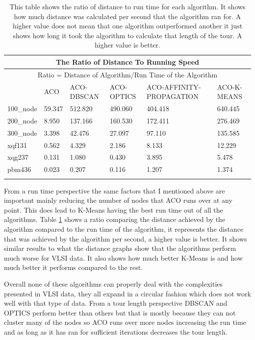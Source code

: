 \begin{longtable}[c]{|p{2cm}|p{1cm}|p{2cm}|p{2cm}|p{3cm}|p{2cm}|}
\hline
\multicolumn{6}{|c|}{The Ratio of Distance To Running Speed}                          \\ \hline
\endhead
%
\multicolumn{6}{|c|}{Ratio = Distance of Algorithm/Run Time of the Algorithm}         \\ \hline
          & ACO    & ACO-DBSCAN & ACO-OPTICS & ACO-AFFINITY-PROPAGATION & ACO-K-MEANS \\ \hline
100\_node & 59.347 & 512.820    & 490.060    & 404.418                  & 640.445     \\ \hline
200\_node & 8.950  & 137.166    & 160.530    & 172.411                  & 276.469     \\ \hline
300\_node & 3.398  & 42.476     & 27.097     & 97.110                   & 135.585     \\ \hline
xqf131    & 0.562  & 4.329      & 2.186      & 8.133                    & 12.229      \\ \hline
xqg237    & 0.131  & 1.080      & 0.430      & 3.895                    & 5.478       \\ \hline
pbm436    & 0.023  & 0.207      & 0.116      & 1.207                    & 1.374       \\ \hline
\caption{This table shows the ratio of distance to run time for each algorithm. It shows how much distance was calculated per second that the algorithm ran for. A higher value does not mean that one algorithm outperformed another it just shows how long it took the algorithm to calculate that length of the tour. A higher value is better. }
\label{tab:ratio_distance_run_time_table}\\
\end{longtable}

From a run time perspective the same factors that I mentioned above are important mainly reducing the number of nodes that ACO runs over at any point. This does lead to K-Means having the best run time out of all the algorithms. Table \ref{tab:ratio_distance_run_time_table} shows a ratio comparing the distance achieved by the algorithm compared to the run time of the algorithm, it represents the distance that was achieved by the algorithm per second, a higher value is better. It shows similar results to what the distance graphs show that the algorithms perform much worse for VLSI data. It also shows how much better K-Means is and how much better it performs compared to the rest.

Overall none of these algorithms can properly deal with the complexities presented in VLSI data, they all expand in a circular fashion which does not work well with that type of data. From a tour length perspective DBSCAN and OPTICS perform better than others but that is mostly because they can not cluster many of the nodes so ACO runs over more nodes increasing the run time and as long as it has ran for sufficient iterations decreases the tour length.


